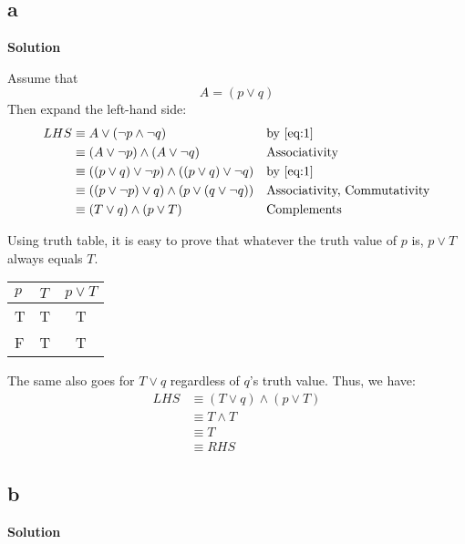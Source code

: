 \subsection{a}
\textbf{Solution}

Assume that
\begin{equation}
\label{eq:1}
  A = (p \lor q)
\end{equation}
Then expand the left-hand side:
\begin{align*}
  LHS
  & \equiv A \lor (\neg p \land \neg q)
  && \text{by \eqref{eq:1}} \\
  & \equiv (A \lor \neg p) \land (A \lor \neg q)
  && \text{Associativity} \\
  & \equiv ((p \lor q) \lor \neg p) \land ((p \lor q) \lor \neg q)
  && \text{by \eqref{eq:1}} \\
  & \equiv ((p \lor \neg p) \lor q) \land (p \lor (q \lor \neg q))
  && \text{Associativity, Commutativity} \\
  & \equiv (T \lor q) \land (p \lor T)
  && \text{Complements}
\end{align*}

Using truth table, it is easy to prove that whatever the truth value of \(p\) is, \(p \lor T\) always equals \(T\).

\begin{center}
\begin{tabular}{|l|l|c|}
  \hline
  \(p\) & \(T\) & \(p \lor T\) \\
  \hline
  T & T & T  \\
  F & T & T  \\
  \hline
\end{tabular}
\end{center}

The same also goes for \(T \lor q\) regardless of \(q\)'s truth value. Thus, we have:
\begin{align*}
  LHS
  & \equiv (T \lor q) \land (p \lor T) \\
  & \equiv T \land T \\
  & \equiv T \\
  & \equiv RHS
\end{align*}

\subsection{b}
\textbf{Solution}


